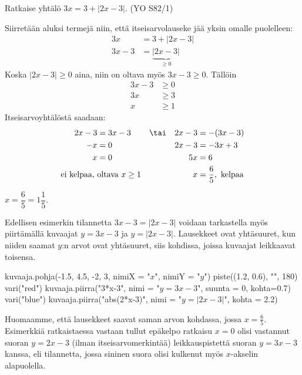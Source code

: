 \begin{esimerkki}
Ratkaise yhtälö $3x=3+|2x-3|$. (YO S82/1)

\begin{esimratk}
Siirretään aluksi termejä niin, että itseisarvolauseke jää yksin omalle puolelleen:
\begin{align*}
3x & =3+|2x-3|  \\
3x-3 & =\underbrace{|2x-3|}_{\geq 0}
\end{align*}
Koska $|2x-3|\geq0$ aina, niin on oltava myös $3x-3\geq0$. Tällöin
\begin{align*}
	3x-3&\geq0 \\
	3x&\geq3 \\
	x&\geq1
\end{align*}
Itseisarvoyhtälöstä saadaan:
\begin{align*}
	2x-3&=3x-3   & &\tai & 2x-3 & =-(3x-3) \\
	-x&=0        && & 2x-3&=-3x+3 \\
	x&=0         && & 5x&=6 \\
	\text{ei kelpaa, } & \text{oltava $x\geq1$}  && & x&=\frac{6}{5}, \text{ kelpaa}
\end{align*}
\end{esimratk}

\begin{esimvast}
$x=\dfrac{6}{5}=1\dfrac{1}{5}$.
\end{esimvast}
\end{esimerkki}

Edellisen esimerkin tilannetta $3x-3=|2x-3|$ voidaan tarkastella myös piirtämällä kuvaajat $y=3x-3$ ja $y=|2x-3|$. Lausekkeet ovat yhtäsuuret, kun niiden saamat $y$:n arvot ovat yhtäsuuret, siis kohdissa, joissa kuvaajat leikkaavat toisensa.

\begin{kuva}
    kuvaaja.pohja(-1.5, 4.5, -2, 3, nimiX = "$x$", nimiY = "$y$")
    piste((1.2, 0.6), "", 180)
    vari("red")
    kuvaaja.piirra("3*x-3", nimi = "$y=3x - 3$", suunta = 0, kohta=0.7)
    vari("blue")
    kuvaaja.piirra("abs(2*x-3)", nimi = "$y=|2x - 3|$", kohta = 2.2)
\end{kuva}

Huomaamme, että lausekkeet saavat saman arvon kohdassa, jossa \mbox{$x=\frac{6}{5}$}. Esimerkkiä ratkaistaessa vastaan tullut epäkelpo ratkaisu $x=0$ olisi vastannut suoran $y=2x-3$ (ilman itseisarvomerkintää) leikkauspistettä suoran $y=3x-3$ kanssa, eli tilannetta, jossa sininen suora olisi kulkenut myös $x$-akselin alapuolella.


